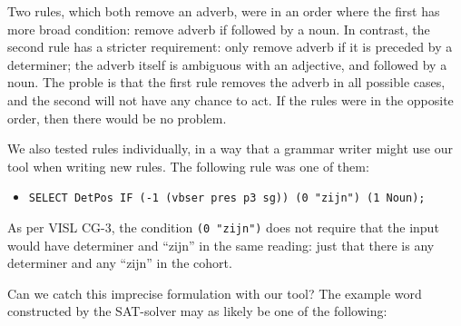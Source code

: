 Two rules, which both remove an adverb, were in an order where the first has more broad condition: remove adverb if followed by a noun. In contrast, the second rule has a stricter requirement: only remove adverb if it is preceded by a determiner; the adverb itself is ambiguous with an adjective, and followed by a noun. The proble is that the first rule removes the adverb in all possible cases, and the second will not have any chance to act. If the rules were in the opposite order, then there would be no problem.





We also tested rules individually, in a way that a grammar writer might use our tool when writing new rules.
The following rule was one of them:

\begin{itemize}
\item[] 
\texttt{SELECT DetPos IF (-1 (vbser pres p3 sg)) (0 "zijn") (1 Noun);}
\end{itemize} 

As per VISL CG-3, the condition \texttt{(0 "zijn")} does not require that the input would have determiner and ``zijn'' in the same reading: just that there is any determiner and any ``zijn'' in the cohort. 


Can we catch this imprecise formulation with our tool? The example word constructed by the SAT-solver may as likely be one of the following:

